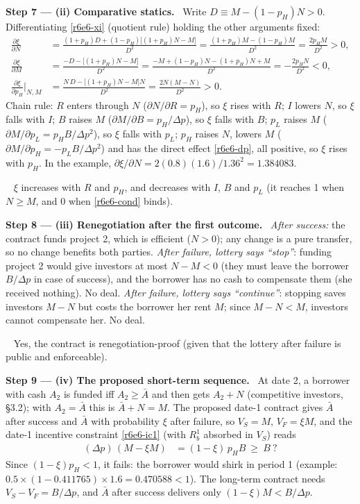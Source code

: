\documentclass[11pt,a4paper]{article}
\newcommand{\step}[2]{\par\medskip\noindent\textbf{Step #1 --- #2.}~}
\newcommand{\answer}[1]{\par\smallskip\noindent\fbox{\textbf{Answer #1.}}~}
\begin{document}
\step{7}{(ii) Comparative statics} Write $D\equiv M-(1-p_H)N>0$. Differentiating \eqref{r6e6-xi} (quotient rule) holding the other arguments fixed:
\begin{align}
  \frac{\partial\xi}{\partial N} &= \frac{(1+p_H)D+(1-p_H)\big[(1+p_H)N-M\big]}{D^2}
     = \frac{(1+p_H)M-(1-p_H)M}{D^2} = \frac{2p_HM}{D^2}>0, \label{r6e6-dN}\\
  \frac{\partial\xi}{\partial M} &= \frac{-D-\big[(1+p_H)N-M\big]}{D^2}
     = \frac{-M+(1-p_H)N-(1+p_H)N+M}{D^2} = -\frac{2p_HN}{D^2}<0, \label{r6e6-dM}\\
  \frac{\partial\xi}{\partial p_H}\Big|_{N,M} &= \frac{N\,D-\big[(1+p_H)N-M\big]N}{D^2} = \frac{2N(M-N)}{D^2}>0. \label{r6e6-dp}
\end{align}
Chain rule: $R$ enters through $N$ ($\partial N/\partial R=p_H$), so $\xi$ rises with $R$; $I$ lowers $N$, so $\xi$ falls with $I$; $B$ raises $M$ ($\partial M/\partial B=p_H/\Delta p$), so $\xi$ falls with $B$; $p_L$ raises $M$ ($\partial M/\partial p_L=p_HB/\Delta p^2$), so $\xi$ falls with $p_L$; $p_H$ raises $N$, lowers $M$ ($\partial M/\partial p_H=-p_LB/\Delta p^2$) and has the direct effect \eqref{r6e6-dp}, all positive, so $\xi$ rises with $p_H$. In the example, $\partial\xi/\partial N=2(0.8)(1.6)/1.36^2=1.384083$.

\answer{(ii)} $\xi$ increases with $R$ and $p_H$, and decreases with $I$, $B$ and $p_L$ (it reaches 1 when $N\ge M$, and 0 when \eqref{r6e6-cond} binds).

\step{8}{(iii) Renegotiation after the first outcome} \emph{After success:} the contract funds project 2, which is efficient ($N>0$); any change is a pure transfer, so no change benefits both parties. \emph{After failure, lottery says ``stop''}: funding project 2 would give investors at most $N-M<0$ (they must leave the borrower $B/\Delta p$ in case of success), and the borrower has no cash to compensate them (she received nothing). No deal. \emph{After failure, lottery says ``continue''}: stopping saves investors $M-N$ but costs the borrower her rent $M$; since $M-N<M$, investors cannot compensate her. No deal.

\answer{(iii)} Yes, the contract is renegotiation-proof (given that the lottery after failure is public and enforceable).

\step{9}{(iv) The proposed short-term sequence} At date 2, a borrower with cash $A_2$ is funded iff $A_2\ge\bar A$ and then gets $A_2+N$ (competitive investors, \S 3.2); with $A_2=\bar A$ this is $\bar A+N=M$. The proposed date-1 contract gives $\bar A$ after success and $\bar A$ with probability $\xi$ after failure, so $V_S=M$, $V_F=\xi M$, and the date-1 incentive constraint \eqref{r6e6-ic1} (with $R_b^1$ absorbed in $V_S$) reads
\begin{align}
  (\Delta p)\,(M-\xi M) &= (1-\xi)\,p_HB \ \ge\ B\ ? \nonumber
\end{align}
Since $(1-\xi)p_H<1$, it fails: the borrower would shirk in period 1 (example: $0.5\times(1-0.411765)\times1.6=0.470588<1$). The long-term contract needs $V_S-V_F=B/\Delta p$, and $\bar A$ after success delivers only $(1-\xi)M<B/\Delta p$.
\end{document}
